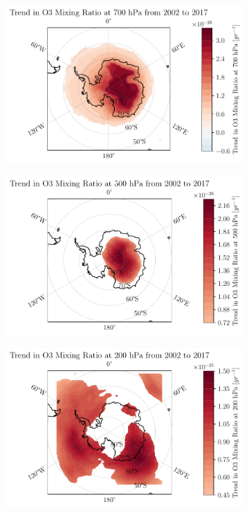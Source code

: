 \documentclass[../main.tex]{subfiles}
\begin{document}
\begin{figure}[hbt!]
    \begin{subfigure}[b]{0.5\textwidth}
    \includegraphics[width=\textwidth]{images/2021w5/chapter7/hres/trend_spatial_o3_700}
    \end{subfigure}
    \begin{subfigure}[b]{0.5\textwidth}
    \includegraphics[width=\textwidth]{images/2021w5/chapter7/hres/trend_spatial_o3_500}
    \end{subfigure}
    \begin{subfigure}[b]{0.5\textwidth}
    \includegraphics[width=\textwidth]{images/2021w5/chapter7/hres/trend_spatial_o3_200}

\end{subfigure}
\end{figure}
\end{document}
